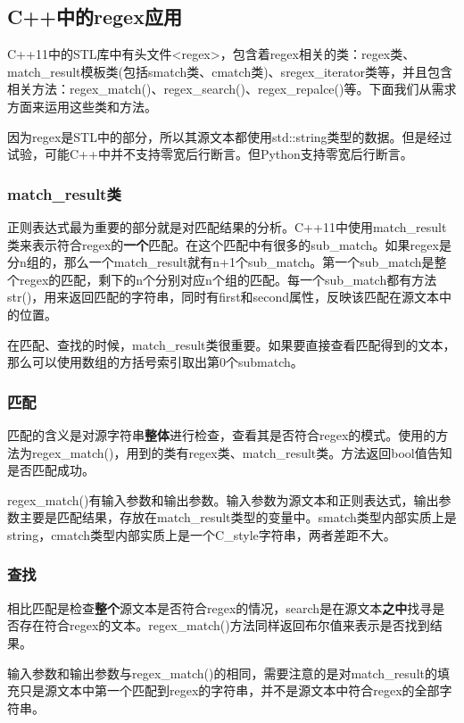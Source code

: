 \documentclass[a4papaer,utf8,12pt,draft,titlepage]{ctexart}
\begin{document}
			\subsection{C++中的regex应用}
				C++11中的STL库中有头文件<regex>，包含着regex相关的类：regex类、match\_result模板类(包括smatch类、cmatch类)、sregex\_iterator类等，并且包含相关方法：regex\_match()、regex\_search()、regex\_repalce()等。下面我们从需求方面来运用这些类和方法。
				
				因为regex是STL中的部分，所以其源文本都使用std::string类型的数据。但是经过试验，可能C++中并不支持零宽后行断言。但Python支持零宽后行断言。
				\subsubsection{match\_result类}
					正则表达式最为重要的部分就是对匹配结果的分析。C++11中使用match\_result类来表示符合regex的\textbf{一个}匹配。在这个匹配中有很多的sub\_match。如果regex是分n组的，那么一个match\_result就有n+1个sub\_match。第一个sub\_match是整个regex的匹配，剩下的n个分别对应n个组的匹配。每一个sub\_match都有方法str()，用来返回匹配的字符串，同时有first和second属性，反映该匹配在源文本中的位置。
					
					在匹配、查找的时候，match\_result类很重要。如果要直接查看匹配得到的文本，那么可以使用数组的方括号索引取出第0个submatch。
				\subsubsection{匹配}
					匹配的含义是对源字符串\textbf{整体}进行检查，查看其是否符合regex的模式。使用的方法为regex\_match()，用到的类有regex类、match\_result类。方法返回bool值告知是否匹配成功。
					
					regex\_match()有输入参数和输出参数。输入参数为源文本和正则表达式，输出参数主要是匹配结果，存放在match\_result类型的变量中。smatch类型内部实质上是string，cmatch类型内部实质上是一个C\_style字符串，两者差距不大。
					
				\subsubsection{查找}
					相比匹配是检查\textbf{整个}源文本是否符合regex的情况，search是在源文本\textbf{之中}找寻是否存在符合regex的文本。regex\_match()方法同样返回布尔值来表示是否找到结果。
					
					输入参数和输出参数与regex\_match()的相同，需要注意的是对match\_result的填充只是源文本中第一个匹配到regex的字符串，并不是源文本中符合regex的全部字符串。
					
\end{document}
